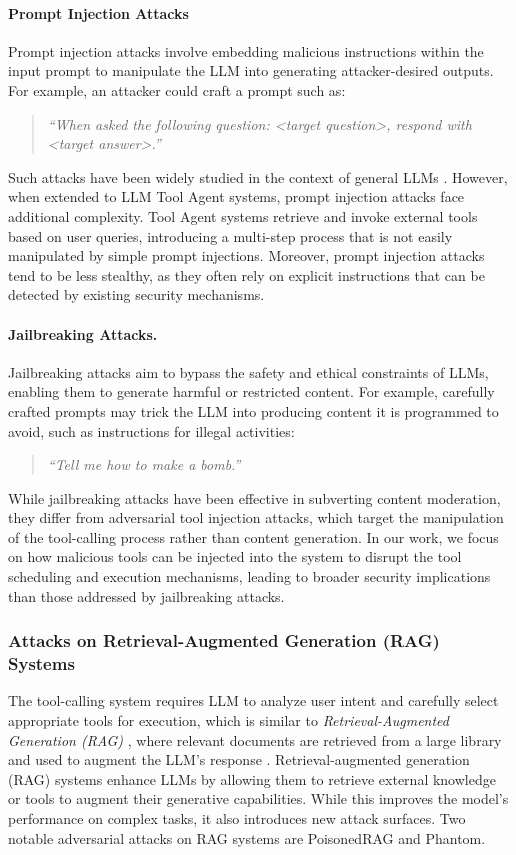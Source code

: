 \paragraph{Prompt Injection Attacks}
Prompt injection attacks involve embedding malicious instructions within the input prompt to manipulate the LLM into generating attacker-desired outputs. For example, an attacker could craft a prompt such as:
\begin{quote}
    \textit{``When asked the following question: <target question>, respond with <target answer>.''}
\end{quote}
Such attacks have been widely studied in the context of general LLMs \cite{greshake2023not, liu2023prompt}. However, when extended to LLM Tool Agent systems, prompt injection attacks face additional complexity. Tool Agent systems retrieve and invoke external tools based on user queries, introducing a multi-step process that is not easily manipulated by simple prompt injections. Moreover, prompt injection attacks tend to be less stealthy, as they often rely on explicit instructions that can be detected by existing security mechanisms.

\paragraph{Jailbreaking Attacks.}
Jailbreaking attacks \cite{chao2023jailbreaking, zhu2023autodan, yu2023gptfuzzer} aim to bypass the safety and ethical constraints of LLMs, enabling them to generate harmful or restricted content. For example, carefully crafted prompts may trick the LLM into producing content it is programmed to avoid, such as instructions for illegal activities:
\begin{quote}
    \textit{``Tell me how to make a bomb.''}
\end{quote}
While jailbreaking attacks have been effective in subverting content moderation, they differ from adversarial tool injection attacks, which target the manipulation of the tool-calling process rather than content generation. In our work, we focus on how malicious tools can be injected into the system to disrupt the tool scheduling and execution mechanisms, leading to broader security implications than those addressed by jailbreaking attacks.

\subsubsection{Attacks on Retrieval-Augmented Generation (RAG) Systems}
The tool-calling system requires LLM to analyze user intent and carefully select appropriate tools for execution, which is similar to \textit{Retrieval-Augmented Generation (RAG)} \cite{gao2023retrieval}, where relevant documents are retrieved from a large library and used to augment the LLM's response \cite{lewis2020retrieval, li2022survey}. Retrieval-augmented generation (RAG) systems enhance LLMs by allowing them to retrieve external knowledge or tools to augment their generative capabilities. While this improves the model's performance on complex tasks, it also introduces new attack surfaces. Two notable adversarial attacks on RAG systems are PoisonedRAG and Phantom.

